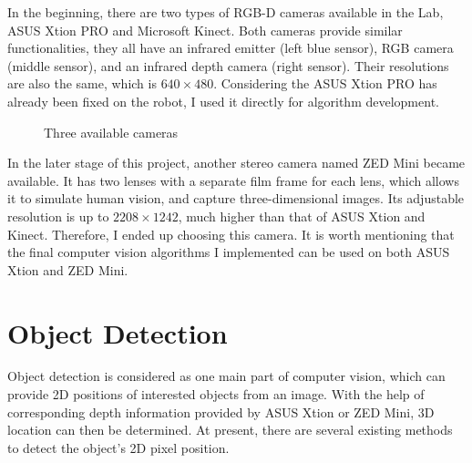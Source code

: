 In the beginning, there are two types of RGB-D cameras available in the Lab, ASUS Xtion PRO and Microsoft Kinect. Both cameras provide similar functionalities, they all have an infrared emitter (left blue sensor), RGB camera (middle sensor), and an infrared depth camera (right sensor). Their resolutions are also the same, which is $640 \times 480$. Considering the ASUS Xtion PRO has already been fixed on the robot, I used it directly for algorithm development.

\begin{figure}[H]
\centering
{}
\caption{Three available cameras}
\label{camera}
\end{figure}

In the later stage of this project, another stereo camera named ZED Mini became available. It has two lenses with a separate film frame for each lens, which allows it to simulate human vision, and capture three-dimensional images. Its adjustable resolution is up to $2208 \times 1242$, much higher than that of ASUS Xtion and Kinect. Therefore, I ended up choosing this camera. It is worth mentioning that the final computer vision algorithms I implemented can be used on both ASUS Xtion and ZED Mini.


\section{Object Detection} \label{od}
Object detection is considered as one main part of computer vision, which can provide 2D positions of interested objects from an image. With the help of corresponding depth information provided by ASUS Xtion or ZED Mini, 3D location can then be determined. At present, there are several existing methods to detect the object's 2D pixel position.

